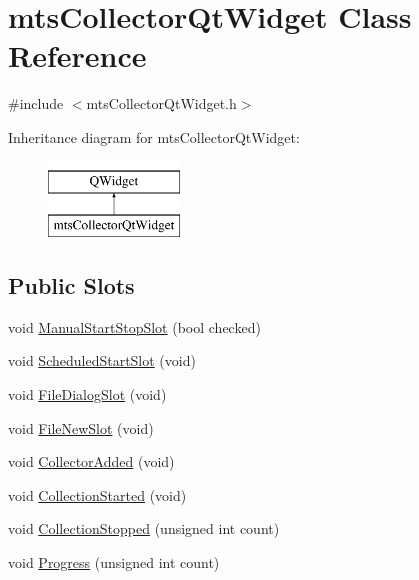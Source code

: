 \hypertarget{classmts_collector_qt_widget}{\section{mts\-Collector\-Qt\-Widget Class Reference}
\label{classmts_collector_qt_widget}
}


{\ttfamily \#include $<$mts\-Collector\-Qt\-Widget.\-h$>$}

Inheritance diagram for mts\-Collector\-Qt\-Widget\-:\begin{figure}[H]
\begin{center}
\leavevmode
\includegraphics[height=2.000000cm]{d3/d0c/classmts_collector_qt_widget}
\end{center}
\end{figure}
\subsection*{Public Slots}
\begin{DoxyCompactItemize}
\item 
void \hyperlink{classmts_collector_qt_widget_ac84427666102b30301dc281035022370}{Manual\-Start\-Stop\-Slot} (bool checked)
\item 
void \hyperlink{classmts_collector_qt_widget_ae1f872571b518006dbac846732799bbf}{Scheduled\-Start\-Slot} (void)
\item 
void \hyperlink{classmts_collector_qt_widget_a9bfa3b15b9c73fe7a74a5c014f54283b}{File\-Dialog\-Slot} (void)
\item 
void \hyperlink{classmts_collector_qt_widget_add029ad069320cee33a3c71ca321c31c}{File\-New\-Slot} (void)
\item 
void \hyperlink{classmts_collector_qt_widget_ab80b163bdeff15ee02b654af0df624e1}{Collector\-Added} (void)
\item 
void \hyperlink{classmts_collector_qt_widget_a2e3642bfedf9a9b924dabccb053566bb}{Collection\-Started} (void)
\item 
void \hyperlink{classmts_collector_qt_widget_a061ce1d006282693529ed3301e91e1dc}{Collection\-Stopped} (unsigned int count)
\item 
void \hyperlink{classmts_collector_qt_widget_abee7d8df4566028839d766bcad663fed}{Progress} (unsigned int count)
\end{DoxyCompactItemize}
